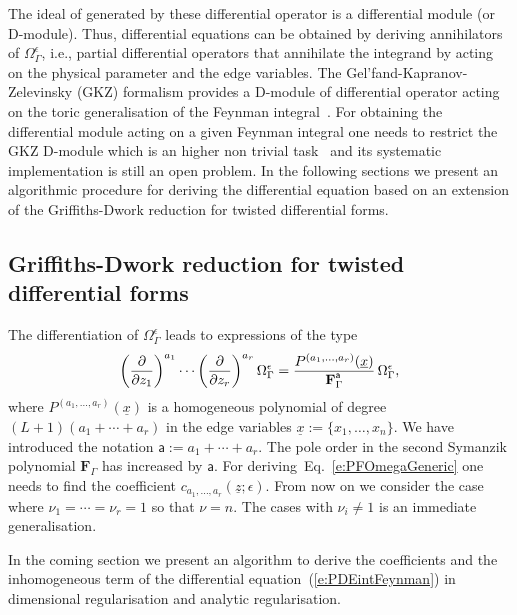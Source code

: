 \documentclass[a4paper,12pt]{article}
\numberwithin{equation}{section}
\numberwithin{figure}{section}
\begin{document}
The ideal of generated by these
differential operator is a differential module (or D-module).  Thus,
differential equations can be obtained by deriving  annihilators  of
$\Omega_\Gamma^\epsilon$, i.e., partial differential operators that
annihilate  the integrand by acting on the physical parameter and the
edge variables.   The Gel'fand-Kapranov-Zelevinsky (GKZ) formalism provides
a D-module of differential operator acting on the toric generalisation
of the Feynman
integral~\cite{Vanhove:2018mto,delaCruz:2019skx,Klausen:2019hrg,Feng:2019bdx,Klemm:2019dbm,Ananthanarayan:2022ntm,Agostini:2022cgv,
  Munch:2022ouq}.  For obtaining the differential module acting on a
given Feynman integral one needs to restrict the GKZ  D-module which
is an higher non trivial task~\cite{delaCruz:2019skx,Chestnov:2023kww} and its systematic implementation is
still an open problem. In the following sections we present an
algorithmic procedure for deriving the differential equation based on
an extension of the Griffiths-Dwork reduction for twisted differential forms.


\subsection{Griffiths-Dwork reduction for twisted differential forms}\label{sec:griff-dwork-reduct}
The    differentiation of $\Omega_\Gamma^\epsilon$ 
leads  to  expressions of the type 
\begin{equation}\label{e:PDE}
\left(\partial\over \partial z_1\right)^{a_1}\cdots\left(\partial
  \over\partial z_r\right)^{a_r} \Omega_\Gamma^\epsilon=
{  P^{(a_1,\dots,a_r)}(\underline x)\over \textbf{F}_\Gamma^{\mathsf {a}}}\, \Omega_\Gamma^\epsilon,
\end{equation}
where 
$  P^{(a_1,\dots,a_r)}(\underline x)$ is a
  homogeneous polynomial of degree $(L+1)(a_1+\cdots+a_r)$ in
 the edge variables $\underline x:=\{x_1,\dots, x_n\}$.
 We have introduced the notation $\mathsf{a}:=a_1+\cdots +a_r$. 
The
  pole order in the second Symanzik polynomial $\textbf{F}_\Gamma$ has increased by
  $\mathsf a$. 
  For deriving~Eq.~\eqref{e:PFOmegaGeneric} one needs to find the
  coefficient $c_{a_1,\dots, a_r}(\underline z;\epsilon)$.  From now on we consider the case where
  $\nu_1=\cdots=\nu_r=1$ so that $\nu=n$. The cases with $\nu_i\neq1$
  is an immediate generalisation.


 In the coming section we present an algorithm to derive the
  coefficients and the inhomogeneous term of the differential
  equation~(\ref{e:PDEintFeynman}) in dimensional regularisation and analytic regularisation.
\end{document}
